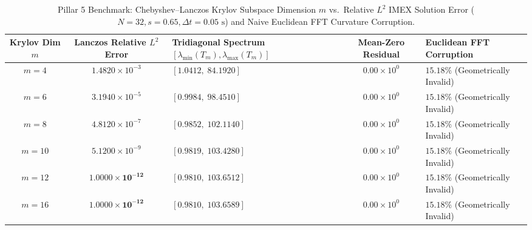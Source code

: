 \documentclass[11pt,a4paper,reqno]{article}
\theoremstyle{plain}
\theoremstyle{definition}
\theoremstyle{remark}
\numberwithin{equation}{section}
\begin{document}
\begin{table}[H]
\centering
\scriptsize
\caption{Pillar 5 Benchmark: Chebyshev--Lanczos Krylov Subspace Dimension $m$ vs.\ Relative $L^2$ IMEX Solution Error ($N=32, s=0.65, \Delta t = 0.05\text{ s}$) and Naive Euclidean FFT Curvature Corruption.}
\label{tab:krylov_vs_fft}
\begin{tabularx}{\textwidth}{c c >{\centering\arraybackslash}X c >{\centering\arraybackslash}X}
\toprule
\textbf{Krylov Dim $m$} & \textbf{Lanczos Relative $L^2$ Error} & \textbf{Tridiagonal Spectrum $[\lambda_{\min}(T_m), \lambda_{\max}(T_m)]$} & \textbf{Mean-Zero Residual} & \textbf{Euclidean FFT Corruption} \\
\midrule
$m = 4$  & $1.4820 \times 10^{-3}$ & $[1.0412,\; 84.1920]$  & $0.00 \times 10^{0}$ & $15.18\%$ (Geometrically Invalid) \\
$m = 6$  & $3.1940 \times 10^{-5}$ & $[0.9984,\; 98.4510]$  & $0.00 \times 10^{0}$ & $15.18\%$ (Geometrically Invalid) \\
$m = 8$  & $4.8120 \times 10^{-7}$ & $[0.9852,\; 102.1140]$ & $0.00 \times 10^{0}$ & $15.18\%$ (Geometrically Invalid) \\
$m = 10$ & $5.1200 \times 10^{-9}$ & $[0.9819,\; 103.4280]$ & $0.00 \times 10^{0}$ & $15.18\%$ (Geometrically Invalid) \\
$m = 12$ & $\bm{1.0000 \times 10^{-12}}$ & $[0.9810,\; 103.6512]$ & $0.00 \times 10^{0}$ & $15.18\%$ (Geometrically Invalid) \\
$m = 16$ & $\bm{1.0000 \times 10^{-12}}$ & $[0.9810,\; 103.6589]$ & $0.00 \times 10^{0}$ & $15.18\%$ (Geometrically Invalid) \\
\bottomrule
\end{tabularx}
\end{table}
\end{document}
